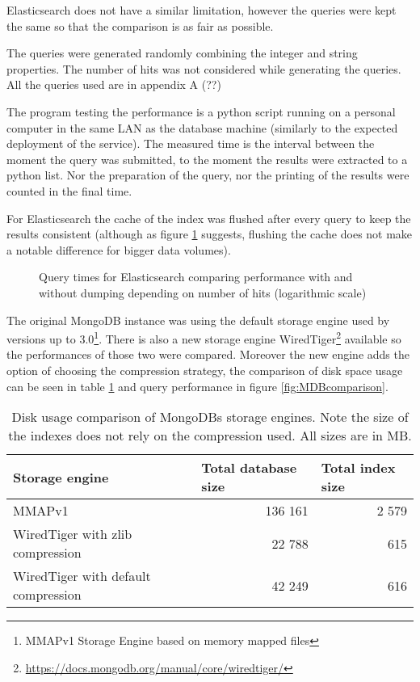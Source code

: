 Elasticsearch does not have a similar limitation, however the queries were kept
the same so that the comparison is as fair as possible. 

The queries were generated randomly combining the integer and string properties. The number of hits was not 
considered while generating the queries. All the queries used are in appendix A (??)%

The program testing the performance is a python script running on a personal computer in the same LAN as the 
database machine (similarly to the expected deployment of the service). The measured time is the interval between 
the moment the query was submitted, to the moment the results were extracted to a python list. Nor the 
preparation of the query, nor the printing of the results were counted in the final time. 

For Elasticsearch the cache of the index was flushed after every query to keep the results consistent (although as 
figure \ref{fig:EScache} suggests, flushing the cache does not make a notable difference for bigger data volumes). 

\begin{figure}[h]
	\centering
	
	\caption{Query times for Elasticsearch comparing performance with and without dumping depending on number of 
	hits (logarithmic scale)}
	\label{fig:EScache}
\end{figure}

The original MongoDB instance was using the default storage engine used by versions up to 3.0\footnote{MMAPv1 
Storage Engine based on memory mapped files}. There is also a new storage engine WiredTiger\footnote{
\url{https://docs.mongodb.org/manual/core/wiredtiger/}} available so the performances of those two were compared.
Moreover the new engine adds the option of choosing the compression strategy, the comparison of disk space usage 
can be seen in table \ref{tab:MongoComp} and query performance in figure \ref{fig:MDBcomparison}.

\begin{table}[h]
\centering
\label{tab:MongoComp}
\begin{tabular}{|l|r|r|}
\hline
Storage engine                      & \multicolumn{1}{l|}{Total database size} & \multicolumn{1}{l|}{Total index size} \\ \hline
MMAPv1                              & 136 161                                  & 2 579                                 \\ \hline
WiredTiger with zlib compression    & 22 788                                   & 615                                   \\ \hline
WiredTiger with default compression & 42 249                                   & 616                                   \\ \hline
\end{tabular}
\caption{Disk usage comparison of MongoDBs storage engines. Note the size of the indexes does not rely on the
compression used. All sizes are in MB.}
\end{table}

